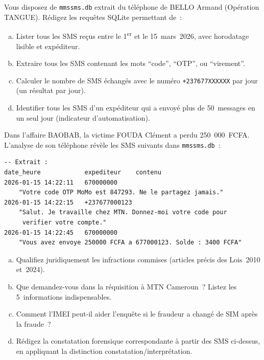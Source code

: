 \bigskip

\begin{boxexo}[title={\ding{45}\quad Exercice~16.1. Requêtes SQLite \niveaubase}]
Vous disposez de \texttt{mmssms.db} extrait du téléphone de BELLO Armand
(Opération TANGUE). Rédigez les requêtes SQLite permettant de~:
\begin{enumerate}[(a)]
    \item Lister tous les SMS reçus entre le 1\textsuperscript{er} et
          le 15~mars~2026, avec horodatage lisible et expéditeur.
    \item Extraire tous les SMS contenant les mots ``code'', ``OTP'',
          ou ``virement''.
    \item Calculer le nombre de SMS échangés avec le numéro
          \texttt{+237677XXXXXX} par jour (un résultat par jour).
    \item Identifier tous les SMS d'un expéditeur qui a envoyé
          plus de 50~messages en un seul jour (indicateur d'automatisation).
\end{enumerate}
\end{boxexo}

\begin{boxexo}[title={\ding{45}\quad Exercice~16.2. Fraude MoMo \niveaumoyen}]
Dans l'affaire BAOBAB, la victime FOUDA Clément a perdu 250~000~FCFA.
L'analyse de son téléphone révèle les SMS suivants dans \texttt{mmssms.db}~:
\begin{lstlisting}[language=bash_forensique]
-- Extrait :
date_heure            expediteur    contenu
2026-01-15 14:22:11   670000000
    "Votre code OTP MoMo est 847293. Ne le partagez jamais."
2026-01-15 14:22:15   +237677000123
    "Salut. Je travaille chez MTN. Donnez-moi votre code pour
     verifier votre compte."
2026-01-15 14:22:45   670000000
    "Vous avez envoye 250000 FCFA a 677000123. Solde : 3400 FCFA"
\end{lstlisting}
\begin{enumerate}[(a)]
    \item Qualifiez juridiquement les infractions commises (articles
          précis des Lois~2010 et~2024).
    \item Que demandez-vous dans la réquisition à MTN Cameroun~?
          Listez les 5~informations indispensables.
    \item Comment l'IMEI peut-il aider l'enquête si le fraudeur
          a changé de SIM après la fraude~?
    \item Rédigez la constatation forensique correspondante à partir
          des SMS ci-dessus, en appliquant la distinction
          constatation/interprétation.
\end{enumerate}
\end{boxexo}

